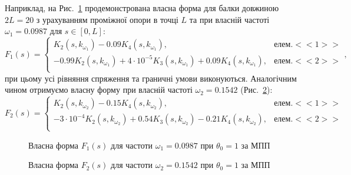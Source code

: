 Наприклад, на Рис.~\ref{pic: TMM F1(s) eigenvector} продемонстрована власна форма для балки довжиною $2L=20$ з урахуванням проміжної опори в точці $L$ та при власній частоті $\omega_1 = 0.0987$ для $s \in [0,L]:$
\begin{equation}\label{eq: TMM F1(s) eigenvector}
    F_1(s) = 
    \begin{cases*}
        K_2(s,k_{\omega_1}) - 0.09 K_4(s,k_{\omega_1}), & елем. <<1>> \\
        -0.99 K_2(s,k_{\omega_1}) + 4\cdot 10^{-5} K_3(s,k_{\omega_1}) + 0.09 K_4(s,k_{\omega_1}), & елем. <<2>> \\
    \end{cases*}, 
\end{equation}
при цьому усі рівняння спряження та граничні умови виконуються. Аналогічним чином отримуємо власну форму при власній частоті $\omega_2 = 0.1542$ (Рис.~\ref{pic: TMM F2(s) eigenvector}):
\begin{equation}\label{eq: TMM F2(s) eigenvector}
    F_2(s) = 
    \begin{cases*}
        K_2(s,k_{\omega_2}) - 0.15 K_4(s,k_{\omega_2}), & елем. <<1>> \\
        -3\cdot 10^{-4} K_2(s,k_{\omega_2}) + 0.54 K_3(s,k_{\omega_2}) - 0.21 K_4(s,k_{\omega_2}), & елем. <<2>> \\
    \end{cases*}
\end{equation}

\vspace{0.4cm}
\begin{figure}[H]\centering
    \resizebox{\linewidth}{!}{}
    \caption{Власна форма $F_1(s)$ для частоти $\omega_1 = 0.0987$ при $\theta_0=1$ за МПП}
    \label{pic: TMM F1(s) eigenvector}
\end{figure}

\begin{figure}[H]\centering
    \resizebox{\linewidth}{!}{}
    \caption{Власна форма $F_2(s)$ для частоти $\omega_2 = 0.1542$ при $\theta_0=1$ за МПП}
    \label{pic: TMM F2(s) eigenvector}
\end{figure}

